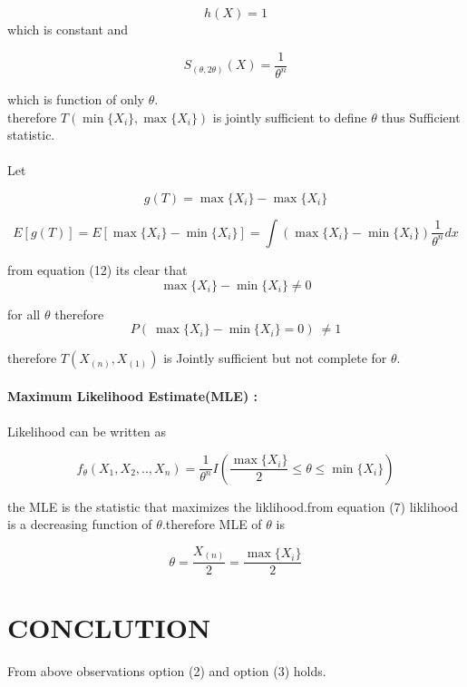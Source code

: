 \documentclass[journal,12pt,twocolumn]{IEEEtran}
\begin{document}
\begin{equation}
        h(X)=1
\end{equation}
 which is constant and
 
\begin{equation}
        S_{(\theta,2\theta)}(X)=\frac{1}{\theta^n}
\end{equation}

 which is function of only $\theta$.\\
therefore $T(\min\{X_i\},\max\{X_i\})$ is jointly sufficient to define $\theta$ thus Sufficient statistic.\\ \\
Let 

\begin{equation}
        g(T)=\max\{X_i\}-\max\{X_i\}
\end{equation}

\begin{equation}
        E[g(T)]=E[\max\{X_i\}-\min\{X_i\}]=\int (\max\{X_i\}-\min\{X_i\})\frac{1}{\theta^n}dx
\end{equation}

from equation (12) its clear that
\begin{equation}
        \max\{X_i\}-\min\{X_i\}\neq0
\end{equation}

for all $\theta$ therefore 
\begin{equation}
        P(\ \max\{X_i\}-\min\{X_i\}=0 )\ \neq1
\end{equation}

therefore $T(X_{(n)},X_{(1)})$ is Jointly sufficient but not complete for $\theta$. \\ \\
\textbf{Maximum Likelihood Estimate(MLE) :}\\ \\
Likelihood can be written as 

\begin{equation}
        f_\theta(X_1,X_2,..,X_n)=\frac{1}{\theta^n}I\left( \frac{\max     \{X_i\}}{2}\leq\theta\leq \min\{X_i\}\right)
\end{equation}

the MLE is the statistic that maximizes the liklihood.from equation (7) liklihood is a decreasing function of $\theta$.therefore MLE of $\theta$ is 

\begin{equation}
        \theta=\frac{X_{(n)}}{2}=\frac{\max\{X_i\}}{2}
\end{equation}

\section{\textbf{CONCLUTION}}
From above observations option (2) and option (3) holds.
\end{document}

